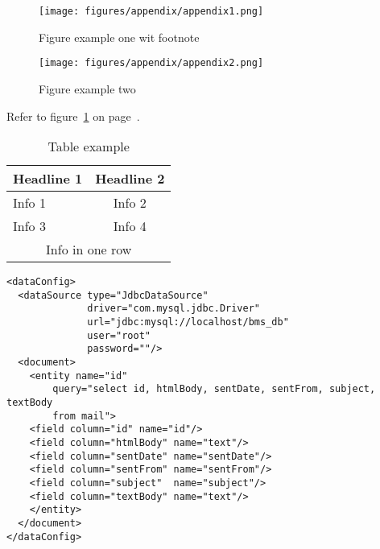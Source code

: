\begin{figure}[htb]
    \centering
    \texttt{[image: figures/appendix/appendix1.png]}
    \caption[Figure example one with footnote]{Figure example one wit footnote\footnotemark}
    \label{fig:exampleone}
\end{figure}

\begin{figure}[htb]
    \centering
    \texttt{[image: figures/appendix/appendix2.png]}
    \caption[Figure example two]{Figure example two}
    \label{fig:exampletwo}
\end{figure}

Refer to figure~\ref{fig:exampleone} on page~\pageref{fig:exampleone}.


\begin{table}[htbp]
    \centering
    \begin{tabular}{ | l | c | }
        \hline
        Headline 1 & Headline 2 \\ \hline \hline
        Info 1 & Info 2 \\ \hline
        Info 3 & Info 4 \\ \hline
        \hline
        \multicolumn{2}{|c|}{Info in one row} \\
        \hline
  \end{tabular}
    \caption[Table example]{Table example}
    \label{tab:example}
\end{table}


\lstset{language=xml}
\begin{lstlisting}[frame=htrbl, caption={The file {\normalfont \ttfamily  data-config.xml} is an example for XML in LaTeX}, label={lst:dataconfigxml}]
<dataConfig>
  <dataSource type="JdbcDataSource" 
              driver="com.mysql.jdbc.Driver"
              url="jdbc:mysql://localhost/bms_db"
              user="root" 
              password=""/>
  <document>
    <entity name="id"
        query="select id, htmlBody, sentDate, sentFrom, subject, textBody
        from mail">
    <field column="id" name="id"/>
    <field column="htmlBody" name="text"/>
    <field column="sentDate" name="sentDate"/>
    <field column="sentFrom" name="sentFrom"/>
    <field column="subject"  name="subject"/>
    <field column="textBody" name="text"/>
    </entity>
  </document>
</dataConfig>
\end{lstlisting}

